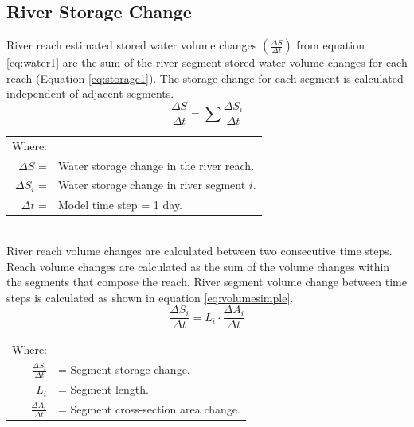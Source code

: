 \begin{linenumbers}
\clearpage{}
\section{River Storage Change}
\label{sec:RiverStorageChange}

River reach estimated stored water volume changes $( \frac{\Delta S}{\Delta t} ) $ from equation \ref{eq:water1} are the sum of the river segment stored water volume changes for each reach (Equation \ref{eq:storage1}).  The storage change for each segment is calculated independent of adjacent segments.
\begin{equation}
	\label{eq:storage1}
	\frac{\Delta S}{\Delta t} = \sum \frac{\Delta S_i}{\Delta t}
\end{equation}
\begin{tabular}{r p{5.5in}}
Where:\\
$\Delta S$ = & Water storage change in the river reach.\\
$\Delta S_i$ = & Water storage change in river segment $ i $.\\
$ \Delta t $ = & Model time step = 1 day. \\
\end{tabular}\\

River reach volume changes are calculated between two consecutive time steps.  Reach volume changes are calculated as the sum of the volume changes within the segments that compose the reach.  River segment volume change between time steps is calculated as shown in equation \ref{eq:volumesimple}.
\begin{equation}
	\frac{\Delta S_i}{\Delta t}=L_i \cdot \frac{\Delta A_i}{\Delta t}
	\label{eq:volumesimple}
\end{equation}
\begin{tabular}{r p{5.5in}}
	Where:&\\
	$\displaystyle \frac{\Delta S_i}{\Delta t}$ & = Segment storage change.\\
	$L_i$ & = Segment length.\\
	$\displaystyle \frac{\Delta A_i}{\Delta t} $ &= Segment cross-section area change.\\
\end{tabular}\\


\end{linenumbers}
